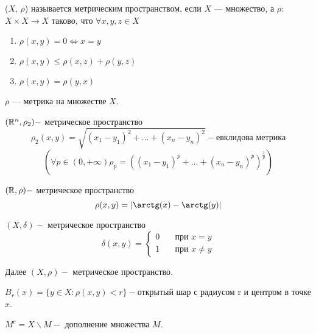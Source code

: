 
\begin{definition}
	($X$, $\rho$) называется метрическим пространством, если 
	$X$ — множество, а $\rho$: $X \times X \to X$ таково, что $\forall x, y, z \in X$
	
		\begin{enumerate}
			\item {$\rho(x,y) = 0 \Leftrightarrow x = y$}
			\item {$\rho(x,y) \le \rho(x,z) + \rho(y,z)$}
			\item {$\rho(x,y) = \rho(y,x)$}
		\end{enumerate}
	
	$\rho$ — метрика на множестве $X$.
\end{definition}

\begin{exercise}
	$(\mathbb{R}^n, \rho_2) - $ метрическое пространство\\
	\[ \rho_2(x, y) = \sqrt{(x_1 - y_1)^2 + \ldots + (x_n - y_n)^2} - \text{евклидова метрика} \]
	\[ \left( \forall p \in (0, + \infty)  \rho_p = ((x_1 - y_1)^p + \ldots + (x_n - y_n)^p)^{\frac{1}{p}} \right) \]
\end{exercise}

\begin{exercise}
	$(\mathbb{R}, \rho) - $  метрическое пространство\\
	\[ \rho(x, y) = |\arctg(x) - \arctg(y)| \]
\end{exercise}

\begin{exercise}
	$(X, \delta) - $  метрическое пространство\\
\[ \delta(x, y) = \begin{cases}
	0	& \quad \text{при } x = y\\
	1	& \quad \text{при } x \neq y
  \end{cases} \]
\end{exercise}

Далее $(X,\rho) - $ метрическое пространство.

\begin{definition}
	$B_r(x) = \{ y \in X : \rho(x, y) < r \} - $открытый шар с радиусом r и центром в точке $x$.
\end{definition}

\begin{definition}
	$M^c = X \backslash M - $ дополнение множества $M$.
\end{definition}

